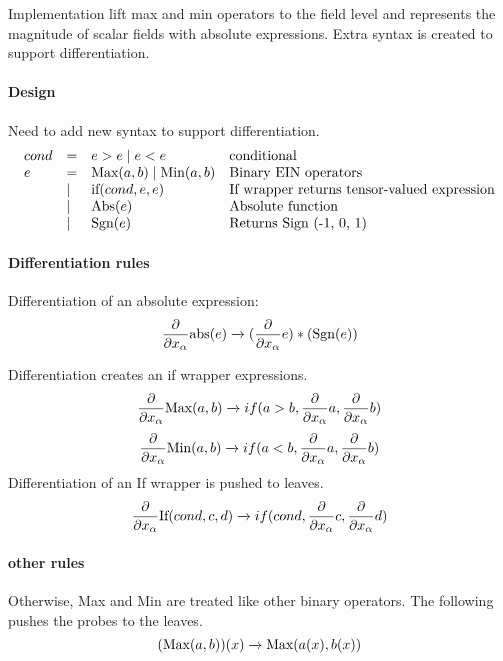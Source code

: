 

Implementation lift max  and min operators to the field level and represents the magnitude of scalar fields with absolute expressions. 
Extra syntax is created to support differentiation.


\paragraph{Design}
Need to add new syntax to support differentiation.
$$\begin{array}{llll}
cond &=& e>e \mid e<e & \text{conditional }\\
e&=&  \text{Max}(a,b)  \mid \text{Min}(a,b) & \text{Binary EIN{} operators}\\
&\mid & \text{if}(cond, e, e)  &\text{If wrapper returns tensor-valued expression}\\
&\mid &\text{Abs}(e) &\text{Absolute function}\\
&\mid &\text{Sgn} (e)& \text{Returns Sign (-1, 0, 1)}\\
\end{array}$$

 \paragraph{Differentiation rules}
 Differentiation of an absolute expression:
  $$\frac{\partial}{\partial x_\alpha} \text{abs}(e) \xrightarrow[]{}
( \frac{\partial}{\partial x_\alpha} e) *(\text{Sgn} (e))
 $$ 

Differentiation creates an if wrapper expressions.
 $$\frac{\partial}{\partial x_\alpha} \text{Max}(a,b) \xrightarrow[]{} if(a>b, \frac{\partial}{\partial x_\alpha}a, \frac{\partial}{\partial x_\alpha}b)  $$
 $$\frac{\partial}{\partial x_\alpha}\text{Min}(a,b) \xrightarrow[]{} if(a<b, \frac{\partial}{\partial x_\alpha}  a, \frac{\partial}{\partial x_\alpha} b)  $$
  Differentiation of an If wrapper is pushed to leaves.
   $$\frac{\partial}{\partial x_\alpha} \text{If}(cond, c,d) \xrightarrow[]{} if(cond, \frac{\partial}{\partial x_\alpha}c, \frac{\partial}{\partial x_\alpha}d)  $$
  \paragraph{other  rules}
Otherwise, Max and Min are treated like  other binary operators. The following pushes the probes to the leaves.
  $$ (\text{Max}(a,b))(x) \xrightarrow[]{} \text{Max}(a(x),  b(x)) $$

